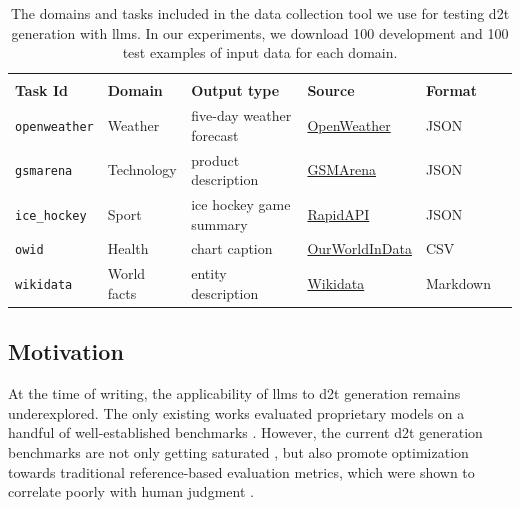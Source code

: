 \begin{table}[t]
    \small
    \centering
    \begin{tabular}{@{}llllll@{}} \toprule                                                                                                                  \\
        \textbf{Task Id}     & \textbf{Domain} & \textbf{Output type}      & \textbf{Source}                                   & \textbf{Format} \\ \midrule
        \texttt{openweather} & Weather         & five-day weather forecast & \href{https://openweathermap.org}{OpenWeather}    & JSON            \\
        \texttt{gsmarena}    & Technology      & product description       & \href{https://www.gsmarena.com}{GSMArena}         & JSON            \\
        \texttt{ice\_hockey} & Sport           & ice hockey game summary   & \href{https://rapidapi.com}{RapidAPI}             & JSON            \\
        \texttt{owid}        & Health          & chart caption             & \href{https://ourworldindata.org}{OurWorldInData} & CSV             \\
        \texttt{wikidata}    & World facts     & entity description        & \href{https://wikidata.org}{Wikidata}             & Markdown        \\\bottomrule
    \end{tabular}
    \caption[The domains and tasks included in \textsc{Quintd}.]{The domains and tasks included in the \datatool{} data collection tool we use for testing \ac{d2t} generation with \acp{llm}. In our experiments, we download 100 development and 100 test examples of input data for each domain.}
    \label{tab:quintd:data}
\end{table}

\subsection{Motivation}
At the time of writing, the applicability of \acp{llm} \cite{ouyang2022TrainingLM,touvronLlamaOpenFoundation2023,jiangMistral7B2023,tunstallZephyrDirectDistillation2023} to \ac{d2t} generation remains underexplored. The only existing works evaluated proprietary models on a handful of well-established benchmarks \cite{axelssonUsingLargeLanguage2023,yuanEvaluatingGenerativeModels2023}. However, the current \ac{d2t} generation benchmarks are not only getting saturated \cite{van_miltenburg_barriers_2023}, but also promote optimization towards traditional reference-based evaluation metrics, which were shown to correlate poorly with human judgment \cite{gehrmannRepairingCrackedFoundation2022,vanderleeHumanEvaluationAutomatically2021,novikovaWhyWeNeed2017}.

